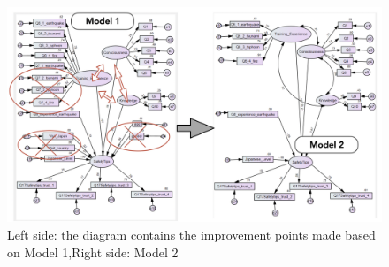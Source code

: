\iffalse
\begin{figure}[h]
  \includegraphics[width=\linewidth]{Figure/Figure25.png}
  \centering
  \caption[SEM model 2]{Left side: the diagram contains the improvement points made based on Model 1,Right side: Model 2}
  \label{fig25}
\end{figure}


